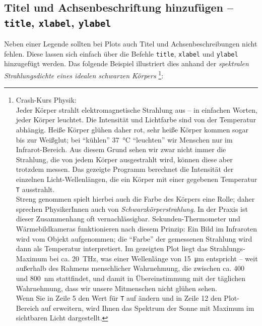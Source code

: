 \subsection{Titel und Achsenbeschriftung hinzufügen -- \texttt{title}, \texttt{xlabel}, \texttt{ylabel}}
Neben einer Legende sollten bei Plots auch Titel und Achsenbeschreibungen nicht fehlen. Diese lassen sich einfach über die Befehle \texttt{title}, \texttt{xlabel} und \texttt{ylabel} hinzugefügt werden. Das folgende Beispiel illustriert dies anhand der \emph{spektralen Strahlungsdichte eines idealen schwarzen Körpers}
\footnote{Crash-Kurs Physik:\\
Jeder Körper strahlt elektromagnetische Strahlung aus -- in einfachen Worten, jeder Körper leuchtet. Die Intensität und Lichtfarbe sind von der Temperatur abhängig. Heiße Körper glühen daher rot, sehr heiße Körper kommen sogar bis zur Weißglut; bei \enquote{kühlen} \SI{37}{\celsius} \enquote{leuchten} wir Menschen nur im Infrarot-Bereich. Aus diesem Grund sehen wir zwar nicht immer die Strahlung, die von jedem Körper ausgestrahlt wird, können diese aber trotzdem messen. Das gezeigte Programm berechnet die Intensität der einzelnen Licht-Wellenlängen, die ein Körper mit einer gegebenen Temperatur \texttt{T} ausstrahlt.\\
Streng genommen spielt hierbei auch die Farbe des Körpers eine Rolle; daher sprechen PhysikerInnen auch von \emph{Schwarzkörperstrahlung}. In der Praxis ist dieser Zusammenhang oft vernachlässigbar. Sekunden-Thermometer und Wärmebildkameras funktionieren nach diesem Prinzip: Ein Bild im Infraroten wird vom Objekt aufgenommen; die \enquote{Farbe} der gemessenen Strahlung wird dann als Temperatur interpretiert. Im gezeigten Plot liegt das Strahlungs-Maximum bei ca. \SI{20}{THz}, was einer Wellenlänge von \SI{15}{\micro\meter} entspricht -- weit außerhalb des Rahmens menschlicher Wahrnehmung, die zwischen ca. 400 und \SI{800}{\nano\meter} stattfindet, und damit in Übereinstimmung mit der täglichen Wahrnehmung, dass wir unsere Mitmenschen nicht glühen sehen.\\
Wenn Sie in Zeile 5 den Wert für \texttt{T} auf  ändern und in Zeile 12 den Plot-Bereich auf  erweitern, wird Ihnen das Spektrum der Sonne mit Maximum im sichtbaren Licht dargestellt.}:

